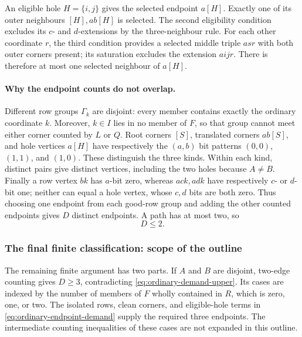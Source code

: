 \documentclass[11pt,a4paper]{article}
\theoremstyle{definition}
\theoremstyle{remark}
\begin{document}
An eligible hole $H=\{i,j\}$ gives the selected endpoint $a[H]$.
Exactly one of its outer neighbours $[H],ab[H]$ is selected. The second
eligibility condition excludes its $c$- and $d$-extensions by the
three-neighbour rule. For each other coordinate $r$, the third condition
provides a selected middle triple $asr$ with both outer corners present;
its saturation excludes the extension $aijr$. There is therefore at
most one selected neighbour of $a[H]$.

\paragraph{Why the endpoint counts do not overlap.}
Different row groups $\Gamma_k$ are disjoint: every member contains
exactly the ordinary coordinate $k$. Moreover, $k\in I$ lies in no
member of $F$, so that group cannot meet either corner counted by $L$
or $Q$. Root corners $[S]$, translated corners $ab[S]$, and hole
vertices $a[H]$ have respectively the $(a,b)$ bit patterns $(0,0)$,
$(1,1)$, and $(1,0)$. These distinguish the three kinds. Within each
kind, distinct pairs give distinct vertices, including the two holes
because $A\ne B$. Finally a row vertex $bk$ has $a$-bit zero, whereas
$ack,adk$ have respectively $c$- or $d$-bit one; neither can equal a
hole vertex, whose $c,d$ bits are both zero. Thus choosing one endpoint
from each good-row group and adding the other counted endpoints gives
$D$ distinct endpoints. A path has at most two, so
\begin{equation}\label{eq:ordinary-demand-upper}
 D\le2.
\end{equation}

\subsubsection*{The final finite classification: scope of the outline}
The remaining finite argument has two parts. If $A$ and $B$ are disjoint,
two-edge counting gives $D\ge3$, contradicting
\eqref{eq:ordinary-demand-upper}. Its cases are indexed by the number
of members of $F$ wholly contained in $R$, which is zero, one, or two.
The isolated rows, clean corners, and eligible-hole terms in
\eqref{eq:ordinary-endpoint-demand} supply the required three endpoints.
The intermediate counting inequalities of these cases are not expanded
in this outline.
\end{document}
